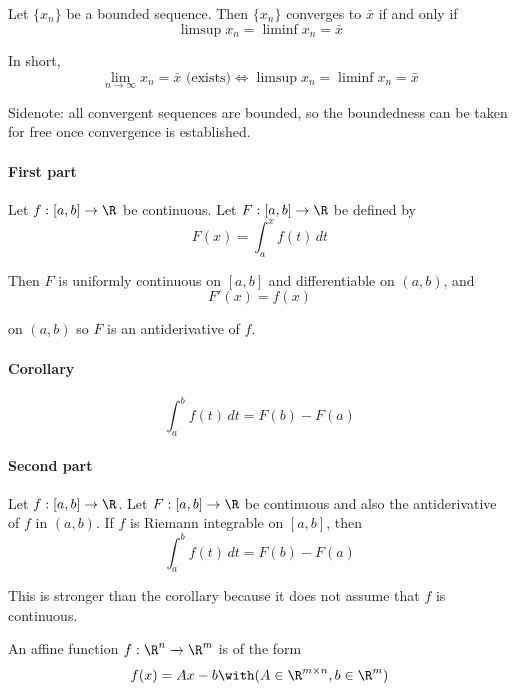
Let $\{x_n\}$ be a bounded sequence. Then $\{x_n\}$ converges to $\bar x$ if
and only if
$$
  \limsup x_n=\liminf x_n=\bar x
$$

In short,
$$
  \lim_{n\to\infty}x_n=\bar x\text{ (exists)}\iff\limsup x_n=\liminf x_n=\bar x
$$

Sidenote: all convergent sequences are bounded, so the boundedness can be taken
for free once convergence is established.


\label{b869dc0}

\paragraph{First part} Let $f:[a,b]\to\R$ be continuous. Let $F:[a,b]\to\R$ be defined by
$$F(x)=\int_a^xf(t)\,dt$$

Then $F$ is uniformly continuous on $[a,b]$ and differentiable on $(a,b)$, and
$$F'(x)=f(x)$$

on $(a,b)$ so $F$ is an antiderivative of $f$.

\paragraph{Corollary}
$$\int_a^bf(t)\,dt=F(b)-F(a)$$

\paragraph{Second part} Let $f:[a,b]\to\R$. Let $F:[a,b]\to\R$ be continuous and also the
antiderivative of $f$ in $(a,b)$. If $f$ is Riemann integrable on $[a,b]$, then
$$\int_a^bf(t)\,dt=F(b)-F(a)$$

This is stronger than the corollary because it does not assume that $f$ is
continuous.


\label{dcb7f73}

An affine function $f:\R^n\to\R^m$ is of the form
$$
  f(x)=Ax-b\with(A\in\R^{m\times n},b\in\R^m)
$$

